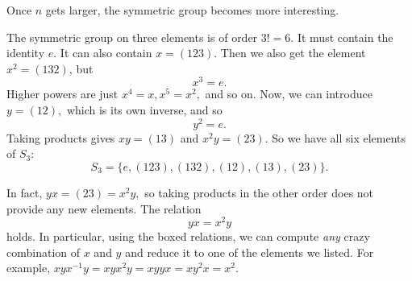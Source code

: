Once $n$ gets larger, the symmetric group becomes more interesting. 
\begin{example}[$S_3$]
The symmetric group on three elements is of order $3! = 6.$ It must contain the identity $e.$ It can also contain $x = (123).$ Then we also get the element $x^2 = (132)$, but \[\boxed{x^3 = e.}\] Higher powers are just $x^4 = x, x^5 = x^2,$ and so on. Now, we can introduce $y = (12),$ which is its own inverse, and so \[\boxed{y^2 = e}.\] Taking products gives $xy = (13)$ and $x^2y = (23).$ So we have all six elements of $S_3$:
\[
S_3 = \{e, (123), (132), (12), (13), (23)\}.
\]

In fact, $yx = (23) = x^2y,$ so taking products in the other order does not provide any new elements. The relation
\[
\boxed{yx = x^2y}
\]
holds. In particular, using the boxed relations, we can compute \emph{any} crazy combination of $x$ and $y$ and reduce it to one of the elements we listed. For example, $xyx^{-1}y = xyx^2y = xyyx = xy^2x = x^2.$ 
\end{example}

\newpage